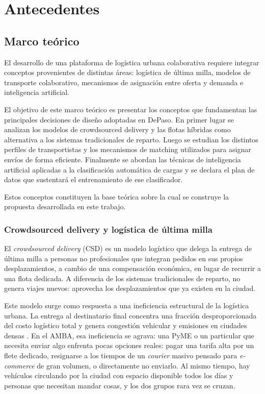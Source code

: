 \chapter{Antecedentes}

\section{Marco teórico}

El desarrollo de una plataforma de logística urbana colaborativa requiere integrar conceptos provenientes de distintas áreas: logística de última milla, modelos de transporte colaborativo, mecanismos de asignación entre oferta y demanda e inteligencia artificial.

El objetivo de este marco teórico es presentar los conceptos que fundamentan las principales decisiones de diseño adoptadas en DePaso. En primer lugar se analizan los modelos de crowdsourced delivery y las flotas híbridas como alternativa a los sistemas tradicionales de reparto. Luego se estudian los distintos perfiles de transportistas y los mecanismos de matching utilizados para asignar envíos de forma eficiente. Finalmente se abordan las técnicas de inteligencia artificial aplicadas a la clasificación automática de cargas y se declara el plan de datos que sustentará el entrenamiento de ese clasificador.

Estos conceptos constituyen la base teórica sobre la cual se construye la propuesta desarrollada en este trabajo.
\subsection{Crowdsourced delivery y logística de última milla}

El \emph{crowdsourced delivery} (CSD) es un modelo logístico que delega la entrega de última milla a personas no profesionales que integran pedidos en sus propios desplazamientos, a cambio de una compensación económica, en lugar de recurrir a una flota dedicada. A diferencia de los sistemas tradicionales de reparto, no genera viajes nuevos: aprovecha los desplazamientos que ya existen en la ciudad.

Este modelo surge como respuesta a una ineficiencia estructural de la logística urbana. La entrega al destinatario final concentra una fracción desproporcionada del costo logístico total y genera congestión vehicular y emisiones en ciudades densas \parencite{YangEtAl2022}. En el AMBA, esa ineficiencia se agrava: una PyME o un particular que necesita enviar algo enfrenta pocas opciones reales: pagar una tarifa alta por un flete dedicado, resignarse a los tiempos de un \emph{courier} masivo pensado para \emph{e-commerce} de gran volumen, o directamente no enviarlo. Al mismo tiempo, hay vehículos circulando por la ciudad con espacio disponible todos los días y personas que necesitan mandar cosas, y los dos grupos rara vez se cruzan.

